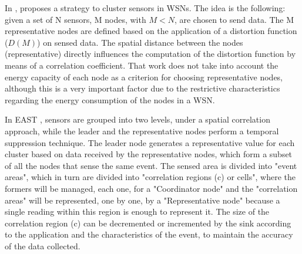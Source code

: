 \documentclass[conference]{IEEEtran}
\begin{document}
In \cite{Vuran2004}, proposes a strategy to cluster sensors in WSNs. The idea is
the following: given a set of N sensors, M nodes, with $M < N$, are chosen to
send data. The M representative nodes are defined based on the application of a
distortion function ($D(M)$) on sensed data.
The spatial distance between the nodes (representative) directly influences the
computation of the distortion function by means of a correlation coefficient.
That work does not take into account the energy capacity of each node as a
criterion for choosing representative nodes, although this is a very important
factor due to the restrictive characteristics regarding the energy consumption
of the nodes in a WSN.

In EAST \cite{Villas2012}, sensors are grouped into two levels, under a spatial
correlation approach, while the leader and the representative nodes perform a
temporal suppression technique.
The leader node generates a representative value for each cluster based on data
received by the representative nodes, which form a subset of all the nodes that
sense the same event. The sensed area is divided into "event areas", which in
turn are divided into "correlation regions (c) or cells", where the formers will
be managed, each one, for a "Coordinator node" and the "correlation areas" will
be represented, one by one, by a "Representative node" because a single reading
within this region is enough to represent it.
The size of the correlation region (c) can be decremented or incremented by the
sink according to the application and the characteristics of the event, to
maintain the accuracy of the data collected.
\end{document}

